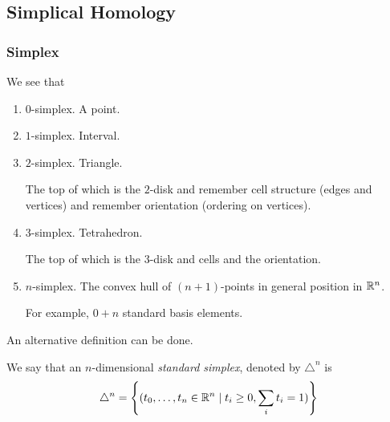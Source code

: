 \subsection{Simplical Homology}
\begin{figure}[H]
	\centering
	\label{fig:simplical-homology-venn-diagram}
\end{figure}
\subsubsection{Simplex}
We see that
\begin{enumerate}
	\item \(0\)-simplex. A point.
	\item \(1\)-simplex. Interval.
	\item \(2\)-simplex. Triangle.
	      \par The top of which is the \(2\)-disk and remember cell structure (edges and vertices) and remember orientation (ordering on vertices).
	\item \(3\)-simplex. Tetrahedron.
	      \par The top of which is the \(3\)-disk and cells and the orientation.
	\item \(n\)-simplex. The convex hull of \((n+1)\)-points in general position in \(\mathbb{\MakeUppercase{r}} ^n\).
	      \par For example, \(0+n\) standard basis elements.
\end{enumerate}
\begin{figure}[H]
	\centering
	\label{fig:simplex}
\end{figure}

An alternative definition can be done.
\begin{definition}\label{def:standard-simplex}
	We say that an \(n\)-dimensional \emph{standard simplex}, denoted by \(\triangle^n\) is
	\[
		\triangle^n = \left\{(t_0, \ldots , t_{n}  \in \mathbb{\MakeUppercase{r}} ^n\mid t_i \geq 0, \sum\limits_{i}t_{i}  = 1 )\right\}
	\]
	\begin{figure}[H]
		\centering
		\label{fig:def:standard-simplex}
	\end{figure}
\end{definition}